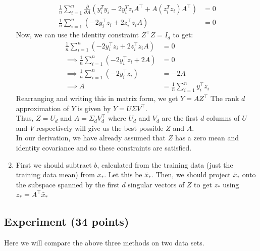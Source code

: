 \documentclass[a4paper]{article}
\theoremstyle{definition}
\begin{document}
\begin{enumerate}
\begin{align*}
        \frac{1}{n} \sum_{i=1}^n \frac{\partial}{\partial A} \left( y_i^Ty_i - 2y_i^Tz_iA^\top + A(z_i^Tz_i)A^\top \right) &= 0 \\
        \frac{1}{n} \sum_{i=1}^n \left(-2 y_i^\top z_i + 2z_i^\top z_iA\right) &= 0
    \end{align*}
    Now, we can use the identity constraint $Z^\top Z = I_d$ to get:
    \begin{align*}
        \frac{1}{n} \sum_{i=1}^n \left(-2 y_i^\top z_i + 2z_i^\top z_iA\right) &= 0\\
        \implies \frac{1}{n} \sum_{i=1}^n \left(-2 y_i^\top z_i + 2A\right) &= 0\\
        \implies \frac{1}{n} \sum_{i=1}^n \left(-2 y_i^\top z_i\right) &= -2A\\
        \implies A &= \frac{1}{n} \sum_{i=1}^n y_i^\top z_i
    \end{align*}
    Rearranging and writing this in matrix form, we get $Y = AZ^\top$
    The rank $d$ approximation of $Y$ is given by $Y = U\Sigma V^\top$. \\
    Thus, $Z = U_d$ and $A = \Sigma_dV_d^\top$ where $U_d$ and $V_d$ are the first $d$ columns of $U$ and $V$ respectively will give us the best possible $Z$ and $A$.\\
    In our derivation, we have already assumed that $Z$ has a zero mean and identity covariance and so these constraints are satisfied.\\

    \item First we should subtract $b$, calculated from the training data (just the training data mean) from $x_*$. Let this be $\tilde{x_*}$. Then, we should project $\tilde{x_*}$ onto the subspace spanned by the first $d$ singular vectors of $Z$ to get $z_*$ using $z_* = A^\top \tilde{x_*}$\

\end{enumerate}
\subsection{Experiment (34 points)}

Here we will compare the above three methods on two data sets. 
\end{document}
